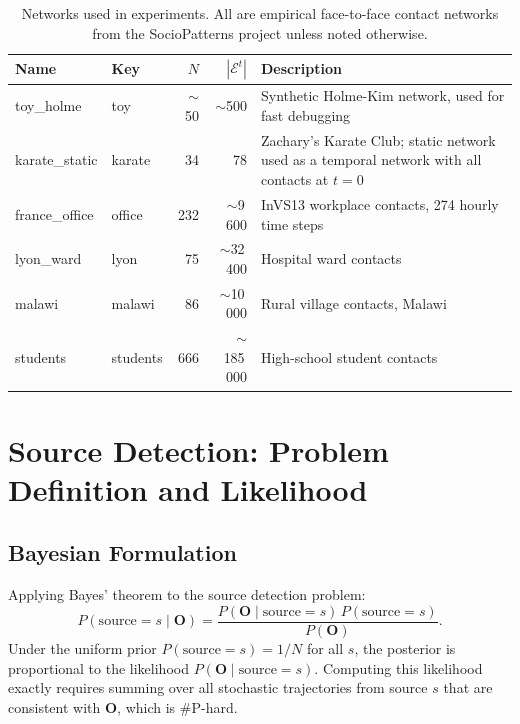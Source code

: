 \documentclass[12pt,a4paper]{report}
\newcommand{\calE}{\mathcal{E}}
\begin{document}
\begin{table}[H]
\centering
\caption{Networks used in experiments. All are empirical face-to-face contact
  networks from the SocioPatterns project unless noted otherwise.}
\label{tab:networks}
\begin{tabular}{llrrp{6cm}}
\toprule
Name & Key & $N$ & $|\calE^t|$ & Description \\
\midrule
toy\_holme & toy & $\sim$50 & $\sim$500 & Synthetic Holme-Kim network, used for
  fast debugging \\
karate\_static & karate & 34 & 78 & Zachary's Karate Club; static network used
  as a temporal network with all contacts at $t=0$ \\
france\_office & office & 232 & $\sim$9\,600 & InVS13 workplace contacts,
  274 hourly time steps \\
lyon\_ward & lyon & 75 & $\sim$32\,400 & Hospital ward contacts \\
malawi & malawi & 86 & $\sim$10\,000 & Rural village contacts, Malawi \\
students & students & 666 & $\sim$185\,000 & High-school student contacts \\
\bottomrule
\end{tabular}
\end{table}

\chapter{Source Detection: Problem Definition and Likelihood}
\label{chap:source_detection}

\section{Bayesian Formulation}

Applying Bayes' theorem to the source detection problem:
\begin{equation}
  P(\text{source} = s \mid \mathbf{O}) = \frac{P(\mathbf{O} \mid \text{source} = s) \, P(\text{source} = s)}{P(\mathbf{O})}.
  \label{eq:bayes}
\end{equation}
Under the uniform prior $P(\text{source} = s) = 1/N$ for all $s$, the
posterior is proportional to the likelihood $P(\mathbf{O} \mid \text{source} =
s)$. Computing this likelihood exactly requires summing over all stochastic
trajectories from source $s$ that are consistent with $\mathbf{O}$, which is
\#P-hard.
\end{document}

